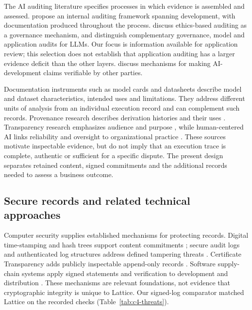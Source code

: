 \documentclass[11pt]{article}
\begin{document}
The AI auditing literature specifies processes in which evidence is assembled and assessed. \citet{raji2020} propose an internal auditing framework spanning development, with documentation produced throughout the process. \citet{mokander2021} discuss ethics-based auditing as a governance mechanism, and \citet{mokander2023} distinguish complementary governance, model and application audits for LLMs. Our focus is information available for application review; this selection does not establish that application auditing has a larger evidence deficit than the other layers. \citet{brundage2020} discuss mechanisms for making AI-development claims verifiable by other parties.

Documentation instruments such as model cards \citep{mitchell2019} and datasheets \citep{gebru2021} describe model and dataset characteristics, intended uses and limitations. They address different units of analysis from an individual execution record and can complement such records. Provenance research describes derivation histories and their uses \citep{moreau2011,herschel2017}. Transparency research emphasizes audience and purpose \citep{felzmann2019,rai2020}, while human-centered AI links reliability and oversight to organizational practice \citep{shneiderman2020}. These sources motivate inspectable evidence, but do not imply that an execution trace is complete, authentic or sufficient for a specific dispute. The present design separates retained content, signed commitments and the additional records needed to assess a business outcome.

\subsection{Secure records and related technical approaches}

Computer security supplies established mechanisms for protecting records. Digital time-stamping and hash trees support content commitments \citep{haber1991,merkle1988}; secure audit logs and authenticated log structures address defined tampering threats \citep{schneier1999,crosby2009}. Certificate Transparency adds publicly inspectable append-only records \citep{laurie2013}. Software supply-chain systems apply signed statements and verification to development and distribution \citep{intoto,samuel2010,newman2022,slsa,dsse}. These mechanisms are relevant foundations, not evidence that cryptographic integrity is unique to Lattice. Our signed-log comparator matched Lattice on the recorded checks (Table~\ref{tab:c4-threats}).
\end{document}
